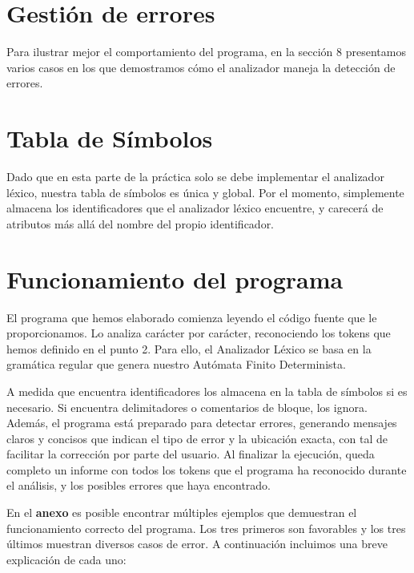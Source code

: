 \documentclass{article}
\begin{document}
\section{Gestión de errores}


Para ilustrar mejor el comportamiento del programa, en la sección 8 presentamos varios casos en los que demostramos cómo el analizador maneja la detección de errores.

\section{Tabla de Símbolos}
Dado que en esta parte de la práctica solo se debe implementar el analizador léxico, nuestra tabla de símbolos es única y global. Por el momento, simplemente almacena los identificadores que el analizador léxico encuentre, y carecerá de atributos más allá del nombre del propio identificador.

\section{Funcionamiento del programa}
El programa que hemos elaborado comienza leyendo el código fuente que le proporcionamos. Lo analiza carácter por carácter, reconociendo los tokens que hemos definido en el punto 2. Para ello, el Analizador Léxico se basa en la gramática regular que genera nuestro Autómata Finito Determinista.

A medida que encuentra identificadores los almacena en la tabla de símbolos si es necesario. Si encuentra delimitadores o comentarios de bloque, los ignora. Además, el programa está preparado para detectar errores, generando mensajes claros y concisos que indican el tipo de error y la ubicación exacta, con tal de facilitar la corrección por parte del usuario. Al finalizar la ejecución, queda completo un informe con todos los tokens que el programa ha reconocido durante el análisis, y los posibles errores que haya encontrado.

En el \textbf{anexo} es posible encontrar múltiples ejemplos que demuestran el funcionamiento correcto del programa. Los tres primeros son favorables y los tres últimos muestran diversos casos de error. A continuación incluimos una breve explicación de cada uno:
\end{document}
